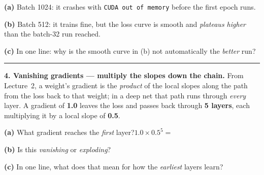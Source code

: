 \documentclass[11pt]{article}
\newif\ifsolution
\newcommand{\blk}[1]{\underline{\hspace{#1}}}
\newcommand{\rb}[2]{\ifsolution\textbf{#1}\else\blk{#2}\fi}
\newcommand{\keybox}[1]{\ifsolution\par\vspace{2pt}%
  \fbox{\parbox{0.965\textwidth}{\small\textbf{Answer.}\; #1}}\par\fi}
\newcommand{\work}[1]{\ifsolution\else\vspace{#1}\fi}
\begin{document}
\vspace{3pt}
\textbf{(a)} Batch 1024: it crashes with \texttt{CUDA out of memory} before the first epoch runs.

\work{1.0cm}
\ifsolution\else\blk{\linewidth}\fi

\textbf{(b)} Batch 512: it trains fine, but the loss curve is smooth and \emph{plateaus higher} than
the batch-32 run reached.

\work{1.2cm}
\ifsolution\else\blk{\linewidth}\fi

\textbf{(c)} In one line: why is the smooth curve in (b) not automatically the \emph{better} run?

\work{0.8cm}
\ifsolution\else\blk{\linewidth}\fi

\keybox{(a) The batch is \textbf{too big to fit in GPU memory} $\rightarrow$ \textbf{reduce the batch
size} (or keep it and use gradient accumulation). (b) With a very large batch you take \textbf{far
fewer weight updates per epoch} \emph{and} the too-clean gradient settles into a \textbf{sharp minimum
that generalizes worse}, so the loss stalls high $\rightarrow$ \textbf{lower the batch toward $\sim$32}
(or train more epochs). (c) A \textbf{smooth loss curve is not automatically good} --- judge a run by
\textbf{where it ends up and by validation}, not by how steady the curve looks.}

\vspace{2pt}\hrule\vspace{5pt}

\textbf{4. Vanishing gradients --- multiply the slopes down the chain.}\; {\small From Lecture~2, a
weight's gradient is the \emph{product} of the local slopes along the path from the loss back to that
weight; in a deep net that path runs through \emph{every} layer. A gradient of \textbf{1.0} leaves the
loss and passes back through \textbf{5 layers}, each multiplying it by a local slope of \textbf{0.5}.}

\vspace{3pt}
\textbf{(a)} What gradient reaches the \emph{first} layer?\quad $1.0\times0.5^{5}=$ \rb{$0.03$}{2.2cm}

\work{0.5cm}

\textbf{(b)} Is this \emph{vanishing} or \emph{exploding}?\quad \rb{vanishing}{3cm}

\textbf{(c)} In one line, what does that mean for how the \emph{earliest} layers learn?

\work{1.0cm}
\ifsolution\else\blk{\linewidth}\fi
\end{document}
